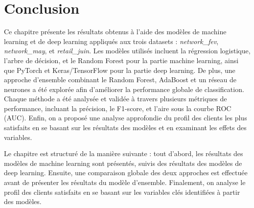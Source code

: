 \section{Conclusion}

Ce chapitre présente les résultats obtenus à l'aide des modèles de machine learning et de deep learning appliqués aux trois datasets : \textit{network\_fev}, \textit{network\_may}, et \textit{retail\_juin}. Les modèles utilisés incluent la régression logistique, l'arbre de décision, et le Random Forest pour la partie machine learning, ainsi que PyTorch et Keras/TensorFlow pour la partie deep learning. De plus, une approche d'ensemble combinant le Random Forest, AdaBoost et un réseau de neurones a été explorée afin d'améliorer la performance globale de classification. Chaque méthode a été analysée et validée à travers plusieurs métriques de performance, incluant la précision, le F1-score, et l'aire sous la courbe ROC (AUC). Enfin, on a proposé une analyse approfondie du profil des clients les plus satisfaits en se basant sur les résultats des modèles et en examinant les effets des variables.

Le chapitre est structuré de la manière suivante : tout d'abord, les résultats des modèles de machine learning sont présentés, suivis des résultats des modèles de deep learning. Ensuite, une comparaison globale des deux approches est effectuée avant de présenter les résultats du modèle d'ensemble. Finalement, on analyse le profil des clients satisfaits en se basant sur les variables clés identifiées à partir des modèles.
